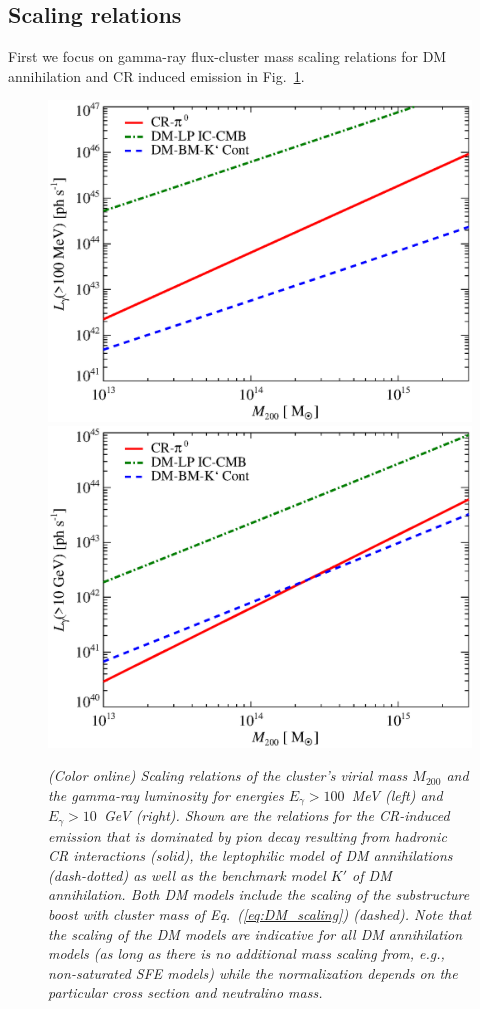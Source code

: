 \documentclass[10pt,aps,pra,reprint,amsmath,amsfonts,amssymb,showpacs,nofootinbib,floatfix]{revtex4-1}
\newcommand{\mvir}{M_{200}}
\begin{document}
\subsection{Scaling relations}
First we focus on gamma-ray flux-cluster mass scaling relations for DM
annihilation and CR induced emission in
Fig.~\ref{fig:lum_mass_scaling}.
\begin{figure}
  \includegraphics[width=0.99\columnwidth]{figures/MLscaling.100M.eps}
  \includegraphics[width=0.99\columnwidth]{figures/MLscaling.10G.eps}
  \caption{\it (Color online) Scaling relations of the cluster's
    virial mass $\mvir$ and the gamma-ray luminosity for energies
    $E_\gamma>100$~MeV (left) and $E_\gamma>10$~GeV (right). Shown are
    the relations for the CR-induced emission that is dominated by
    pion decay resulting from hadronic CR interactions (solid), the
    leptophilic model of DM annihilations (dash-dotted) as well as the
    benchmark model $K'$ of DM annihilation. Both DM models include
    the scaling of the substructure boost with cluster mass of
    Eq.~(\ref{eq:DM_scaling}) (dashed). Note that the scaling of the
    DM models are indicative for all DM annihilation models (as long
    as there is no additional mass scaling from, e.g., non-saturated
    SFE models) while the normalization depends on the particular
    cross section and neutralino mass.}
\label{fig:lum_mass_scaling}
\end{figure}
\end{document}
